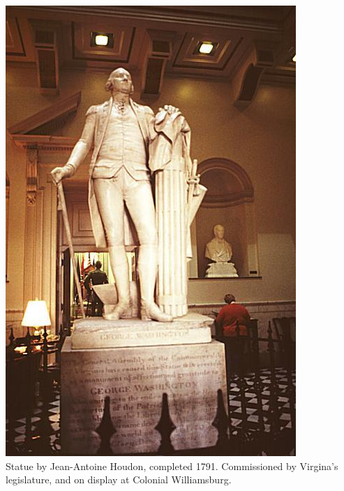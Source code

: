 \begin{frame}
    \centering
    \includegraphics[height=.8\textheight]{img/fasces/houdon-front.jpg} \\
    Statue by Jean-Antoine Houdon, completed 1791. Commissioned by Virgina's legislature, and on display at Colonial Williamsburg. \\
\end{frame}
